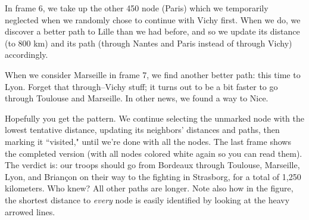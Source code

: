 In frame 6, we take up the other 450 node (Paris) which we temporarily
neglected when we randomly chose to continue with Vichy first. When we do,
we discover a better path to Lille than we had before, and so we update its
distance (to 800 km) and its path (through Nantes and Paris instead of
through Vichy) accordingly.

When we consider Marseille in frame 7, we find another better path: this
time to Lyon. Forget that through--Vichy stuff; it turns out to be a bit
faster to go through Toulouse and Marseille. In other news, we found a way
to Nice.

Hopefully you get the pattern. We continue selecting the unmarked node with
the lowest tentative distance, updating its neighbors' distances and paths,
then marking it ``visited," until we're done with all the nodes. The last
frame shows the completed version (with all nodes colored white again so
you can read them). The verdict is: our troops should go from Bordeaux
through Toulouse, Marseille, Lyon, and Brian\c{c}on on their way to the
fighting in Strasborg, for a total of 1,250 kilometers. Who knew? All other
paths are longer. Note also how in the figure, the shortest distance to
\textit{every} node is easily identified by looking at the heavy arrowed
lines.


